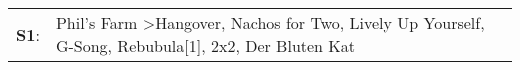\begin{supertabular}{p{0.03\textwidth}p{0.92\textwidth}}
 \textbf{S1}:  &  Phil's Farm\textsuperscript{} \textgreater \enspace Hangover\textsuperscript{}, \enspace Nachos for Two\textsuperscript{}, \enspace Lively Up Yourself\textsuperscript{}, \enspace G-Song\textsuperscript{}, \enspace Rebubula[1]\textsuperscript{}, \enspace 2x2\textsuperscript{}, \enspace Der Bluten Kat\textsuperscript{}  \enspace  \\
\end{supertabular}
